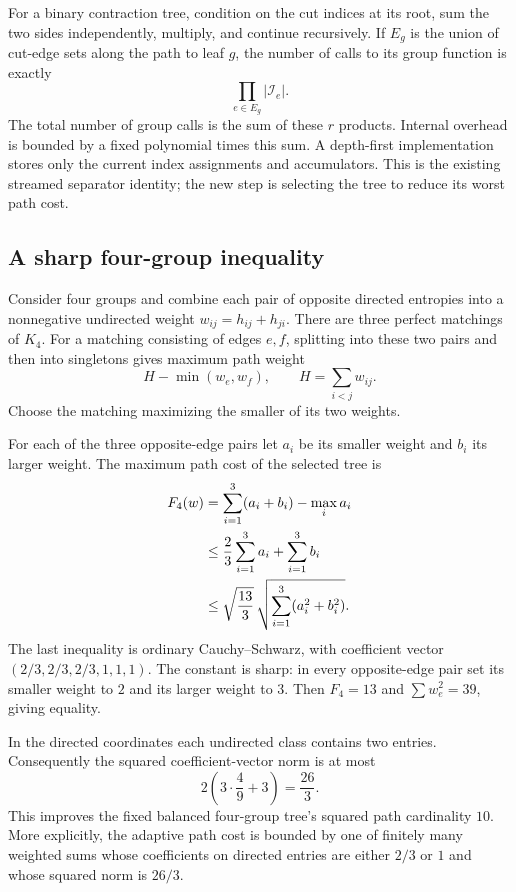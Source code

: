 For a binary contraction tree, condition on the cut indices at its root,
sum the two sides independently, multiply, and continue recursively. If
$E_g$ is the union of cut-edge sets along the path to leaf $g$, the number
of calls to its group function is exactly
\[
 \prod_{e\in E_g}|\mathcal I_e|.
\]
The total number of group calls is the sum of these $r$ products. Internal
overhead is bounded by a fixed polynomial times this sum. A depth-first
implementation stores only the current index assignments and accumulators.
This is the existing streamed separator identity; the new step is selecting
the tree to reduce its worst path cost.

\subsection{A sharp four-group inequality}
Consider four groups and combine each pair of opposite directed entropies
into a nonnegative undirected weight
$w_{ij}=h_{ij}+h_{ji}$. There are three perfect matchings of $K_4$.
For a matching consisting of edges $e,f$, splitting into these two pairs
and then into singletons gives maximum path weight
\[
 H-\min(w_e,w_f),\qquad H=\sum_{i<j}w_{ij}.
\]
Choose the matching maximizing the smaller of its two weights.

For each of the three opposite-edge pairs let $a_i$ be its smaller weight
and $b_i$ its larger weight. The maximum path cost of the selected tree is
\begin{align}
 F_4(w)
 &=\sum_{i=1}^3(a_i+b_i)-\max_i a_i\notag\\
 &\le\frac23\sum_{i=1}^3a_i+\sum_{i=1}^3b_i\notag\\
 &\le\sqrt{\frac{13}{3}}\,
       \sqrt{\sum_{i=1}^3(a_i^2+b_i^2)}.
 \label{eq:new-four-sharp}
\end{align}
The last inequality is ordinary Cauchy--Schwarz, with coefficient vector
$(2/3,2/3,2/3,1,1,1)$.
The constant is sharp: in every opposite-edge pair set its smaller weight
to $2$ and its larger weight to $3$. Then $F_4=13$ and
$\sum w_e^2=39$, giving equality.

In the directed coordinates each undirected class contains two entries.
Consequently the squared coefficient-vector norm is at most
\[
 2\left(3\cdot\frac49+3\right)=\frac{26}{3}.
\]
This improves the fixed balanced four-group tree's squared path cardinality
$10$. More explicitly, the adaptive path cost is bounded by one of finitely
many weighted sums whose coefficients on directed entries are either
$2/3$ or $1$ and whose squared norm is $26/3$.

